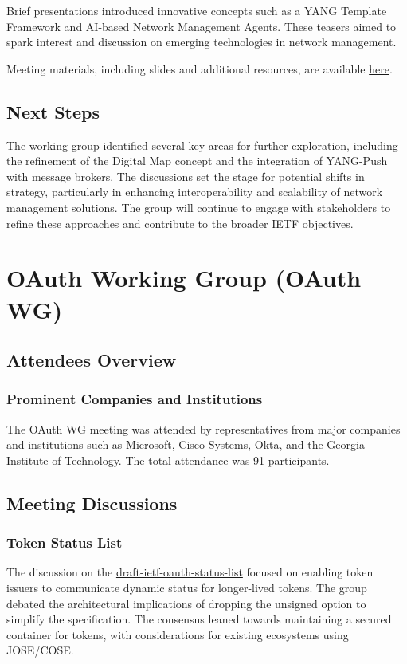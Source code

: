 \documentclass{article}
\begin{document}
Brief presentations introduced innovative concepts such as a YANG Template Framework and AI-based Network Management Agents. These teasers aimed to spark interest and discussion on emerging technologies in network management.

Meeting materials, including slides and additional resources, are available \href{https://datatracker.ietf.org/meeting/121/materials/slides-121-nmop-sessa-chairs-slides-session-1-01}{here}.

\subsection{Next Steps}
The working group identified several key areas for further exploration, including the refinement of the Digital Map concept and the integration of YANG-Push with message brokers. The discussions set the stage for potential shifts in strategy, particularly in enhancing interoperability and scalability of network management solutions. The group will continue to engage with stakeholders to refine these approaches and contribute to the broader IETF objectives.




\newpage

\section{OAuth Working Group (OAuth WG)}

\subsection{Attendees Overview}
\subsubsection{Prominent Companies and Institutions}
The OAuth WG meeting was attended by representatives from major companies and institutions such as Microsoft, Cisco Systems, Okta, and the Georgia Institute of Technology. The total attendance was 91 participants.

\subsection{Meeting Discussions}

\subsubsection{Token Status List}
The discussion on the \href{https://datatracker.ietf.org/doc/html/draft-ietf-oauth-status-list}{draft-ietf-oauth-status-list} focused on enabling token issuers to communicate dynamic status for longer-lived tokens. The group debated the architectural implications of dropping the unsigned option to simplify the specification. The consensus leaned towards maintaining a secured container for tokens, with considerations for existing ecosystems using JOSE/COSE.
\end{document}

